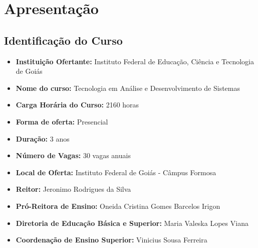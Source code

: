 \documentclass[
	10pt,				%
	openright,			%
	twoside,			%
	a4paper,			%
	english,			%
	french,				%
	brazil,				%
	sumario=tradicional
]{abntex2}
\renewcommand{\textual}{%
  \pagestyle{abntbookheadings}%
  \aliaspagestyle{chapter}{abntbookchapfirst}%
  \nouppercaseheads%
  \bookmarksetup{startatroot}%
}
\begin{document}
\listoftables*
\cleardoublepage

\tableofcontents*
\cleardoublepage

\mainmatter

\chapter*[Apresentação]{Apresentação}

\section*{\textbf{Identificação do Curso}}
\begin{itemize}
	\item \textbf{Instituição Ofertante:} Instituto Federal de Educação, Ciência e Tecnologia de Goiás
	\item \textbf{Nome do curso:} Tecnologia em Análise e Desenvolvimento de Sistemas
	\item \textbf{Carga Horária do Curso:} 2160 horas
	\item \textbf{Forma de oferta:} Presencial
	\item \textbf{Duração:} 3 anos
	\item \textbf{Número de Vagas:} 30 vagas anuais
	\item \textbf{Local de Oferta:} Instituto Federal de Goiás - Câmpus Formosa
	\item \textbf{Reitor:} Jeronimo Rodrigues da Silva
	\item \textbf{Pró-Reitora de Ensino:} Oneida Cristina Gomes Barcelos Irigon
	\item \textbf{Diretoria de Educação Básica e Superior:} Maria Valeska Lopes Viana
	\item \textbf{ Coordenação de Ensino Superior:} Vinicius Sousa Ferreira
\end{itemize}
\end{document}
